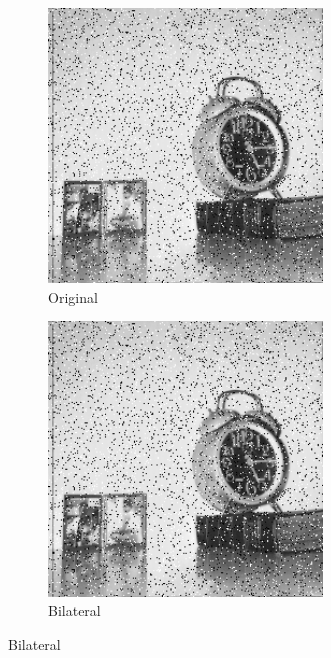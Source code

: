 \documentclass[12pt]{article}
\begin{document}
	\begin{figure}
		\centering
		\begin{subfigure}{0.4\textwidth}
			\centering
			\includegraphics[width=0.8\textwidth]{saltandpepper/SaltAndPepper.png}
			\caption{Original}
		\end{subfigure}
		\begin{subfigure}{0.4\textwidth}
			\centering
			\includegraphics[width=0.8\textwidth]{saltandpepper/SaltAndPepperpngBilateralFilter.png}
			\caption{Bilateral}
		\end{subfigure}
		

\end{figure}
\end{document}
